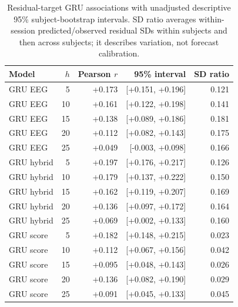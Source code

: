 \begin{table}[!ht]
\centering\small
\setlength{\tabcolsep}{5pt}
\caption{Residual-target GRU associations with unadjusted descriptive 95\% subject-bootstrap intervals. SD ratio averages within-session predicted/observed residual SDs within subjects and then across subjects; it describes variation, not forecast calibration.}
\label{tab:supp_residual_gru_intervals}
\begin{tabular}{lrrrr}
\toprule
Model & $h$ & Pearson $r$ & 95\% interval & SD ratio \\
\midrule
GRU EEG & 5 & +0.173 & [+0.151, +0.196] & 0.121 \\
GRU EEG & 10 & +0.161 & [+0.122, +0.198] & 0.141 \\
GRU EEG & 15 & +0.138 & [+0.089, +0.186] & 0.181 \\
GRU EEG & 20 & +0.112 & [+0.082, +0.143] & 0.175 \\
GRU EEG & 25 & +0.049 & [-0.003, +0.098] & 0.166 \\
GRU hybrid & 5 & +0.197 & [+0.176, +0.217] & 0.126 \\
GRU hybrid & 10 & +0.179 & [+0.137, +0.222] & 0.150 \\
GRU hybrid & 15 & +0.162 & [+0.119, +0.207] & 0.169 \\
GRU hybrid & 20 & +0.136 & [+0.097, +0.172] & 0.164 \\
GRU hybrid & 25 & +0.069 & [+0.002, +0.133] & 0.160 \\
GRU score & 5 & +0.182 & [+0.148, +0.215] & 0.023 \\
GRU score & 10 & +0.112 & [+0.067, +0.156] & 0.042 \\
GRU score & 15 & +0.095 & [+0.048, +0.143] & 0.026 \\
GRU score & 20 & +0.136 & [+0.082, +0.190] & 0.029 \\
GRU score & 25 & +0.091 & [+0.045, +0.133] & 0.045 \\
\bottomrule\end{tabular}\end{table}
